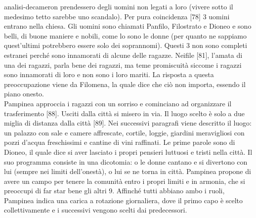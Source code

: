\documentclass[preview]{standalone}
\begin{document}
\begin{snippet}{analisi-decameron}
    prendessero degli uomini non legati a loro (vivere sotto il medesimo tetto sarebbe uno scandalo).
    Per pura coincidenza [78] 3 uomini entrano nella chiesa. Gli uomini sono chiamati Panfilo, Filostrato e Dioneo
    e sono belli, di buone maniere e nobili, come lo sono le donne (per quanto ne sappiamo quest'ultimi potrebbero essere solo dei soprannomi).
    Questi 3 non sono completi estranei perché sono innamorati di alcune delle ragazze.
    Neifile [81], l'amata di una dei ragazzi, parla bene dei ragazzi, ma teme
    promiscuità siccome i ragazzi sono innamorati di loro e non sono i loro mariti.
    La risposta a questa preoccupazione viene da Filomena, la quale dice che ciò non importa,
    essendo il piano onesto. \\
    Pampinea approccia i ragazzi con un sorriso e cominciano ad organizzare il trasferimento [88].
    Usciti dalla città si misero in via. Il luogo scelto è solo a due miglia di distanza dalla città [89].
    Nei successivi paragrafi viene descritto il luogo: un palazzo con sale e camere affrescate, cortile, loggie,
    giardini meravigliosi con pozzi d'acqua freschissimi e cantine di vini raffinati.
    Le prime parole sono di Dioneo, il quale dice si aver lasciato i propri pensieri luttuosi e tristi nella città.
    Il suo programma consiste in una dicotomia: o le donne cantano e si divertono con lui
    (sempre nei limiti dell'onestà), o lui se ne torna in città.
    Pampinea propone di avere un campo per tenere la comunità entro i propri limiti e in armonia,
    che si preoccupi di far star bene gli altri 9.
    Affinché tutti abbiano ambo i ruoli, Pampinea indica una carica a rotazione giornaliera,
    dove il primo capo è scelto collettivamente e i successivi vengono scelti dai predecessori.
\end{snippet}
\end{document}
